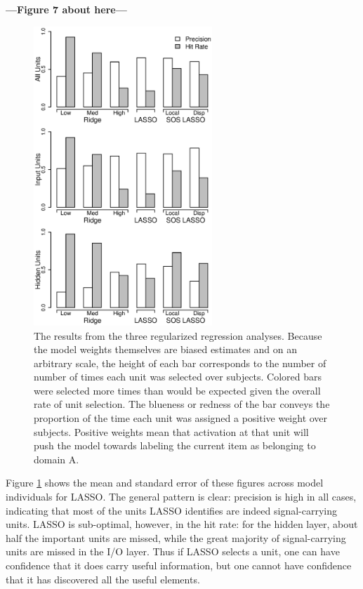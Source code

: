 \textbf{---Figure 7 about here---}
\begin{figure}
\centering
\includegraphics[width=0.6\textwidth]{figures/precision_plot.eps}
\caption{\label{fig.precision} The results from the three regularized regression analyses. Because the model weights themselves are biased estimates and on an arbitrary scale, the height of each bar corresponds to the number of number of times each unit was selected over subjects. Colored bars were selected more times than would be expected given the overall rate of unit selection. The blueness or redness of the bar conveys the proportion of the time each unit was assigned a positive weight over subjects. Positive weights mean that activation at that unit will push the model towards labeling the current item as belonging to domain A.}
\end{figure}

Figure \ref{fig.precision} shows the mean and standard error of these figures across model individuals for LASSO. The general pattern is clear: precision is high in all cases, indicating that most of the units LASSO identifies are indeed signal-carrying units. LASSO is sub-optimal, however, in the hit rate: for the hidden layer, about half the important units are missed, while the great majority of signal-carrying units are missed in the I/O layer. Thus if LASSO selects a unit, one can have confidence that it does carry useful information, but one cannot have confidence that it has discovered all the useful elements.

